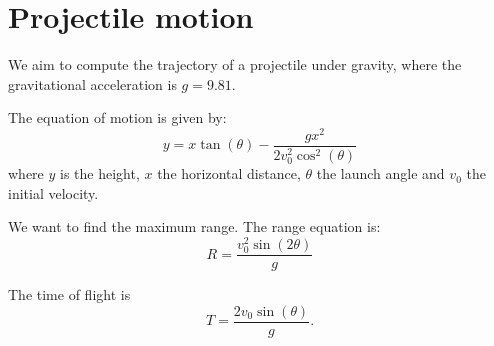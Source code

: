 \documentclass{article}
\begin{document}
\section{Projectile motion}

We aim to compute the trajectory of a projectile under gravity, where the
gravitational acceleration is $g = 9.81$.

The equation of motion is given by:
\begin{equation}\label{eq:trajectory}
y = x \tan(\theta) - \frac{g x^2}{2 v_0^2 \cos^2(\theta)}
\end{equation}
where $y$ is the height, $x$ the horizontal distance, $\theta$ the launch
angle and $v_0$ the initial velocity.

We want to find the maximum range. The range equation is:
\begin{equation}\label{eq:range}
R = \frac{v_0^2 \sin(2\theta)}{g}
\end{equation}

The time of flight is
\begin{equation}\label{eq:time}
T = \frac{2 v_0 \sin(\theta)}{g}.
\end{equation}
\end{document}
